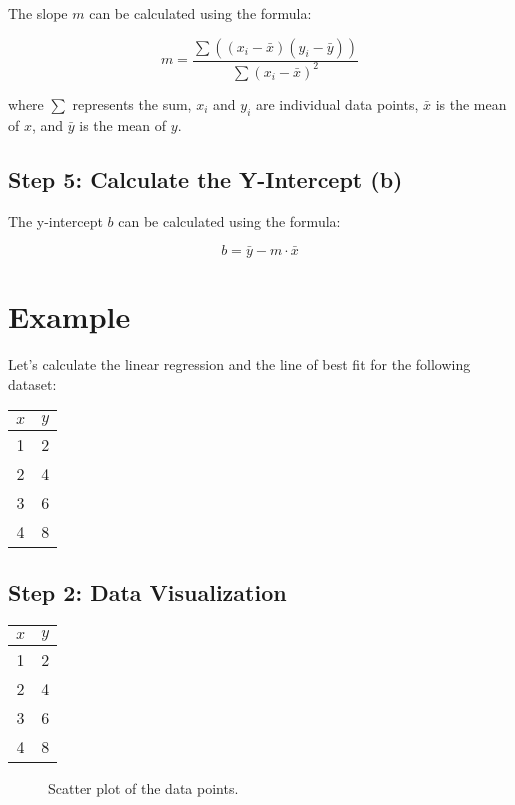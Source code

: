\documentclass{article}
\begin{document}
The slope $m$ can be calculated using the formula:

\[ m = \frac{\sum((x_i - \bar{x})(y_i - \bar{y}))}{\sum(x_i - \bar{x})^2} \]

where $\sum$ represents the sum, $x_i$ and $y_i$ are individual data points, $\bar{x}$ is the mean of $x$, and $\bar{y}$ is the mean of $y$.

\subsection{Step 5: Calculate the Y-Intercept (b)}

The y-intercept $b$ can be calculated using the formula:

\[ b = \bar{y} - m \cdot \bar{x} \]

\section{Example}

Let's calculate the linear regression and the line of best fit for the following dataset:

\begin{table}[H]
\centering
\begin{tabular}{|c|c|}
\hline
$x$ & $y$ \\
\hline
1 & 2 \\
2 & 4 \\
3 & 6 \\
4 & 8 \\
\hline
\end{tabular}
\end{table}

\subsection{Step 2: Data Visualization}

\begin{table}[ht]
\centering
\begin{tabular}{|c|c|}
\hline
$x$ & $y$ \\
\hline
1 & 2 \\
2 & 4 \\
3 & 6 \\
4 & 8 \\
\hline
\end{tabular}
\end{table}

\begin{figure}[ht]
\centering
{}
\caption{Scatter plot of the data points.}
\end{figure}
\end{document}
